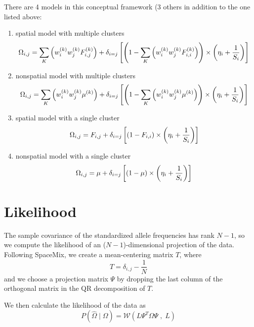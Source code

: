 \documentclass[12pt]{article}
\begin{document}
There are 4 models in this conceptual framework (3 others in addition to the one listed above:
\begin{enumerate}
\item spatial model with multiple clusters
	\begin{equation}
	\Omega_{i,j} = \sum\limits_K \left(	w^{(k)}_iw^{(k)}_j F^{(k)}_{i,j} \right) + 
		\delta_{i=j} \left[
			\left(1-\sum\limits_K \left(	w^{(k)}_iw^{(k)}_j F^{(k)}_{i,i}\right)\right) \times 
			\left( \eta_i + \frac{1}{S_i} \right)
				\right] \notag
	\end{equation}
\item nonspatial model with multiple clusters
	\begin{equation}
	\Omega_{i,j} = \sum\limits_K \left(	w^{(k)}_iw^{(k)}_j \mu^{(k)} \right) + 
		\delta_{i=j} \left[
			\left(1-\sum\limits_K \left(	w^{(k)}_iw^{(k)}_j \mu^{(k)}\right)\right) \times 
			\left( \eta_i + \frac{1}{S_i} \right)
				\right] \notag
	\end{equation}
\item spatial model with a single cluster
	\begin{equation}
	\Omega_{i,j} = F_{i,j}  + 
		\delta_{i=j} \left[
			\left(1-F_{i,i}\right) \times 
			\left( \eta_i + \frac{1}{S_i} \right)
				\right] \notag
	\end{equation}
\item nonspatial model with a single cluster
	\begin{equation}
	\Omega_{i,j} = \mu + 
		\delta_{i=j} \left[
			\left(1-\mu \right) \times 
			\left( \eta_i + \frac{1}{S_i} \right)
				\right] \notag
	\end{equation}
\end{enumerate}

\section{Likelihood}
The sample covariance of the standardized allele frequencies has rank $N-1$, 
so we compute the likelihood of an ($N-1$)-dimensional projection of the data.
Following SpaceMix, we create a mean-centering matrix $T$, where 
\begin{equation}
T = \delta_{i,j} - \frac{1}{N}
\label{mc_matrix}
\end{equation}
and we choose a projection matrix $\Psi$ by dropping the last column 
of the orthogonal matrix in the QR decomposition of $T$.

We then calculate the likelihood of the data as
\begin{equation}
P(\widehat{\Omega} \; | \; \Omega) = \mathcal{W}(L\Psi^T \Omega \Psi \; , \; L)
\label{likelihood}
\end{equation} 
\end{document}
